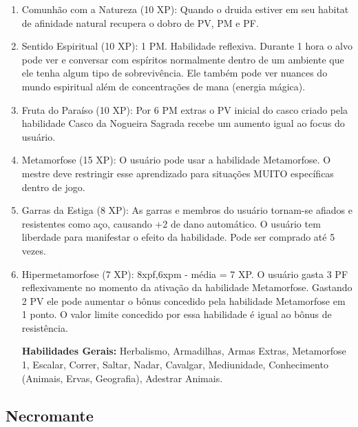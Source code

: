 \begin{enumerate}
		\item Comunhão com a Natureza (10 XP): Quando o druida estiver em seu habitat de afinidade natural recupera o dobro de PV, PM e PF.  

		\item Sentido Espiritual (10 XP): 1 PM. Habilidade reflexiva.\newline
Durante 1 hora o alvo pode ver e conversar com espíritos normalmente dentro de um ambiente que ele tenha algum tipo de sobrevivência. Ele também pode ver nuances do mundo espiritual além de concentrações de mana (energia mágica). 

			\item Fruta do Paraíso (10 XP): Por 6 PM extras o PV inicial do casco criado pela habilidade Casco da Nogueira Sagrada recebe um aumento igual ao focus do usuário.

		\item Metamorfose (15 XP): O usuário pode usar a habilidade Metamorfose. O mestre deve restringir esse aprendizado para situações MUITO específicas dentro de jogo.

  	\item Garras da Estiga (8 XP): As garras e membros do usuário tornam-se afiados e resistentes como aço, causando +2 de dano automático. O usuário tem liberdade para manifestar o efeito da habilidade. Pode ser comprado até 5 vezes.

		\item Hipermetamorfose (7 XP): 8xpf,6xpm - média = 7 XP. O usuário gasta 3 PF reflexivamente no momento da ativação da habilidade Metamorfose. Gastando 2 PV ele pode aumentar o bônus concedido pela habilidade Metamorfose em 1 ponto. O valor limite concedido por essa habilidade é igual ao bônus de resistência.
  
\textbf{Habilidades Gerais:} Herbalismo, Armadilhas, Armas Extras, Metamorfose 1, Escalar, Correr, Saltar, Nadar, Cavalgar, Mediunidade, Conhecimento (Animais, Ervas, Geografia), Adestrar Animais. 
\end{enumerate}

  
  
  \subsection{Necromante}
  
